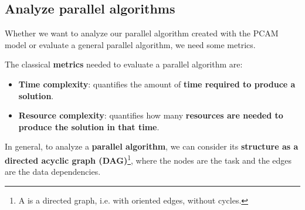 \subsection{Analyze parallel algorithms}

Whether we want to analyze our parallel algorithm created with the PCAM model or evaluate a general parallel algorithm, we need some metrics.

\highspace
The classical \textbf{metrics} needed to evaluate a parallel algorithm are:
\begin{itemize}
    \item \textbf{Time complexity}: quantifies the amount of \textbf{time required to produce a solution}.
    \item \textbf{Resource complexity}: quantifies how many \textbf{resources are needed to produce the solution in that time}.
\end{itemize}
In general, to analyze a \textbf{parallel algorithm}, we can consider its \textbf{structure as a directed acyclic graph (DAG)}\footnote{A  is a directed graph, i.e. with oriented edges, without cycles.}, where the nodes are the task and the edges are the data dependencies.

